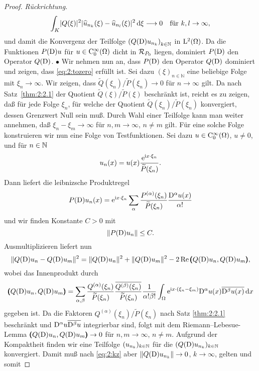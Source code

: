 \begin{proof} {\it Rückrichtung.}
\begin{equation}
\int_K\lvert Q(\xi)\rvert^2\lvert\widehat{u}_{n_k}(\xi)-\widehat{u}_{n_l}(\xi)\rvert^2\,\mathrm d \xi\longrightarrow0
\quad\text{für}~ k,l \rightarrow \infty,
\end{equation}
und damit die Konvergenz der Teilfolge $\left(Q(\mathrm D)u_{n_k} \right)_{k \in \mathbb{N}}$ in $\mathrm L^2(\Omega)$. 
Da die Funktionen $P(\mathrm D)u$ für $u\in \mathrm C^\infty_0(\Omega)$ dicht in $\mathcal R_{P_0}$ liegen, dominiert $P(\mathrm D)$ den Operator $Q(\mathrm D)$.
$\bullet$
Wir nehmen nun an, dass $P(\mathrm D)$ den Operator $Q(\mathrm D)$ dominiert und zeigen, dass \eqref{eq:2:tozero} erfüllt ist.
 Sei dazu $(\xi)_{n \in \mathbb{N}}$ eine beliebige Folge mit $\xi_n \rightarrow \infty$. Wir zeigen, dass $\widetilde{Q}(\xi_{n})/\widetilde{P}(\xi_{n})\to0$ für $n \rightarrow \infty$ gilt. Da nach Satz~\ref{thm:2:2.1} der Quotient $\widetilde Q(\xi)/\widetilde P(\xi)$ beschränkt ist, reicht es zu zeigen, daß für jede Folge $\xi_n$, für welche der Quotient $\widetilde Q(\xi_n)/\widetilde P(\xi_n)$ konvergiert, dessen Grenzwert Null sein muß. Durch Wahl einer Teilfolge kann man weiter annehmen, daß $\xi_n-\xi_m\to\infty$ für $n,m\to\infty$, $n\ne m$ gilt. Für eine solche Folge konstruieren wir nun eine Folge von Testfunktionen.
Sei dazu  $u\in \mathrm C^\infty_0(\Omega)$, $u\neq0$, und für $n\in\mathbb N$
\begin{equation}
u_n(x)=u(x)\frac{\mathrm e^{\mathrm i x \cdot \xi_n}}{\widetilde{P}(\xi_n)}.
\end{equation}
Dann liefert die leibnizsche Produktregel
\begin{equation}
P(\mathrm D)u_n(x)=\mathrm e^{\mathrm i x \cdot \xi_n}\sum_\alpha\frac{P^{(\alpha)}(\xi_n)}{\widetilde{P}(\xi_n)}\frac{\mathrm D^\alpha u(x)}{\alpha!}
\end{equation}
und wir finden Konstante $C>0$ mit
\begin{equation}\label{eq:2:PDunb}
\lVert P(\mathrm D)u_n\rVert\leq C.
\end{equation}
Ausmultiplizieren liefert nun
\begin{equation}\label{eq:2:kz}
\lVert Q(\mathrm D)u_n-Q(\mathrm D)u_m\rVert^2=\lVert Q(\mathrm D)u_n\rVert^2+\lVert Q(\mathrm D)u_m\rVert^2-2\operatorname{Re}\pmb(Q(\mathrm D)u_n,Q(\mathrm D)u_m\pmb), 
\end{equation}
wobei das Innenprodukt durch
\begin{equation}
\pmb(Q(\mathrm D)u_n,Q(\mathrm D)u_m\pmb)=
\sum_{\alpha,\beta}\frac{Q^{(\alpha)}(\xi_n)}{\widetilde{P}(\xi_n)}\frac{\overline{Q^{(\beta)}(\xi_n)}}{\widetilde{P}(\xi_n)}
\frac1{\alpha!\beta!}\int_\Omega \mathrm e^{\mathrm i x \cdot(\xi_n-\xi_m)} \mathrm D^\alpha u(x) \overline{\mathrm D^\beta u(x) }\,\mathrm d  x
\end{equation}
gegeben ist. Da die Faktoren $Q^{(\alpha)}(\xi_n)/\widetilde{P}(\xi_n)$ nach Satz \ref{thm:2:2.1} beschränkt und $\mathrm D^\alpha u\overline{\mathrm D^\beta u}$ integrierbar sind, folgt mit dem Riemann--Lebesue-Lemma $\pmb(Q(\mathrm D)u_n,Q(\mathrm D)u_m\pmb)\to0$ für $n,m\to\infty$, $n\neq m$. Aufgrund der Kompaktheit finden wir eine Teilfolge $(u_{n_k})_{k\in\mathbb N}$ für die $(Q(\mathrm D)u_{n_k})_{k \in \mathbb{N}}$ konvergiert. Damit muß nach \eqref{eq:2:kz}  aber $\|Q(\mathrm D)u_{n_k}\|\to0$, $k\to\infty$, gelten und somit 

\end{proof}
